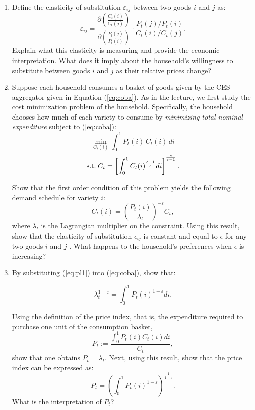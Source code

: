\documentclass[a4paper,11pt]{article}
\begin{document}
\begin{enumerate}
    \item[1.] Define the elasticity of substitution \( \varepsilon_{ij} \) between two goods \( i \) and \( j \) as:
    \[
    \varepsilon_{ij} = \frac{\partial \left( \frac{C_t(i)}{C_t(j)} \right)}{\partial \left( \frac{P_t(j)}{P_t(i)} \right)} \cdot \frac{P_t(j)/P_t(i)}{C_t(i)/C_t(j)}.
    \]
    Explain what this elasticity is measuring and provide the economic interpretation. What does it imply about the household’s willingness to substitute between goods \( i \) and \( j \) as their relative prices change?

    \item[2.] Suppose each household consumes a basket of goods given by the CES aggregator given in Equation (\ref{eq:coba}). As in the lecture, we first study the cost minimization problem of the household. Specifically, the household chooses how much of each variety to consume by \textit{minimizing total nominal expenditure} subject to (\ref{eq:coba}):
\begin{equation*}
\min_{C_{t}(i)}\int_{0}^{1}P_{t}(i)\,C_{t}(i)\,di
\end{equation*}
\begin{equation*}
\mathrm{s.t.}\;
C_t = \left[ \int_{0}^{1}C_{t}(i)^{\frac{\varepsilon -1}{\varepsilon }}di\right] ^{%
\frac{\varepsilon }{\varepsilon -1}}.
\end{equation*}

Show that the first order condition of this problem yields the following demand schedule for variety $i$:
\begin{equation}\label{eq:pl1}
C_{t}(i)=\left( \frac{P_{t}(i)}{\lambda_t}\right) ^{-\varepsilon }C_t,  
\end{equation}
where $\lambda_t$ is the Lagrangian multiplier on the constraint. Using this result, show that the elasticity of substitution \( \epsilon_{ij} \) is constant and equal to \( \epsilon \) for any two goods \( i \) and \( j \) .  What happens to the household’s preferences when $\epsilon$ is increasing?

    \item[3.] By substituting (\ref{eq:pl1}) into (\ref{eq:coba}), show that: 

\begin{equation}\label{lambda_t^}
    \lambda_t^{1-\varepsilon} = \int_0^1P_t(i)^{1-\varepsilon}di.
\end{equation}

Using the definition of the price index, that is, the expenditure required to purchase one unit of the consumption basket,
\begin{equation}\label{P_t}
    P_{t} := \frac{\int_{0}^{1}P_{t}(i)C_t(i)di}{C_t},
\end{equation}
show that one obtains $P_t= \lambda_t$. Next, using this result, show that the price index can be expressed as: 
\begin{equation}\label{P_t (i)}
    P_{t} = \left( \int_0^1P_t(i)^{1-\varepsilon}  \right)^{\frac{1}{1-\varepsilon}}.
\end{equation}
What is the interpretation of $P_t$?
    
\end{enumerate}
\end{document}
